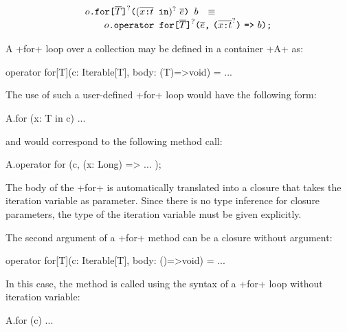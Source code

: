 
$$
\begin{array}{rcl}
  \usrFor{o}{\overline{T}}{\overline{\vardecl{x}{t}}}{\overline{e}}{b}
  & \equiv &
  \\
  \multicolumn{3}{r}{
  \qquad  \libFor{o}{\overline{T}}{\overline{\vardecl{x}{t}}}{\overline{e}}{b}
  }
\end{array}
$$

A \xcd+for+ loop over a collection may be defined in a container \xcd+A+ as:
\begin{xten}
operator for[T](c: Iterable[T], body: (T)=>void) = ...
\end{xten}
%
The use of such a user-defined \xcd+for+ loop would have the following form:
\begin{xten}
A.for (x: T in c) { ... }
\end{xten}
and would correspond to the following method call:
\begin{xten}
A.operator for (c, (x: Long) => { ... });
\end{xten}
%
The body of the \xcd+for+ is automatically translated into a closure
that takes the iteration variable as parameter.
%
Since there is no type inference for closure parameters, the type of
the iteration variable must be given explicitly.

The second argument of a \xcd+for+ method can be a closure without argument:
\begin{xten}
operator for[T](c: Iterable[T], body: ()=>void) = ...
\end{xten}
In this case, the method is called using the syntax of a \xcd+for+ loop without iteration variable:
\begin{xten}
A.for (c) { ... }
\end{xten}

